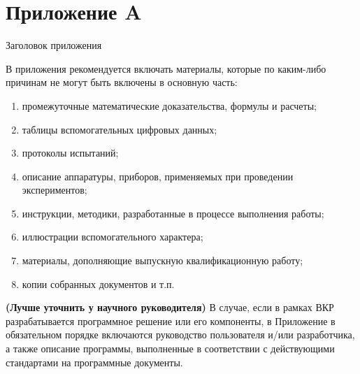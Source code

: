 \chapter*{Приложение A}

\begin{center}
	Заголовок приложения
\end{center}

В приложения рекомендуется включать материалы, которые по каким-либо причинам не могут быть включены в основную часть:
\begin{enumerate}
	\item промежуточные математические доказательства, формулы и расчеты;
	\item таблицы вспомогательных цифровых данных;
	\item протоколы испытаний;
	\item описание аппаратуры, приборов, применяемых при проведении экспериментов;
	\item инструкции, методики, разработанные в процессе выполнения работы;
	\item иллюстрации вспомогательного характера;
	\item материалы, дополняющие выпускную квалификационную работу;
	\item копии собранных документов и т.п.
\end{enumerate}

\textbf{(Лучше уточнить у научного руководителя)} В случае, если в рамках ВКР разрабатывается программное решение или его компоненты, в Приложение в обязательном порядке включаются руководство пользователя и/или разработчика, а также описание программы, выполненные в соответствии с действующими стандартами на программные документы.
